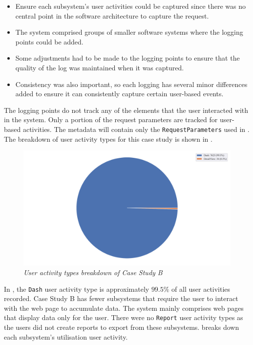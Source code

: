 \begin{itemize}
	\item Ensure each subsystem's user activities could be captured since there was no central point in the software architecture to capture the request. 
	\item The system comprised groups of smaller software systems where the logging points could be added.
	\item Some adjustments had to be made to the logging points to ensure that the quality of the log was maintained when it was captured. 
	\item Consistency was also important, so each logging has several minor differences added to ensure it can consistently capture certain user-based events.
\end{itemize}

The logging points do not track any of the elements that the user interacted with in the system. Only a portion of the request parameters are tracked for user-based activities. The metadata will contain only the \texttt{RequestParameters} used in . The breakdown of user activity types for this case study is shown in .

\begin{figure}[!htb]
	\centering %
	\includegraphics[width=0.95\linewidth]{img/ch3/analysis/case_B_breakdown.pdf}
	\caption[User activity types breakdown of Case Study B]
	{\textit{User activity types breakdown of Case Study B}}\label{fig:ch3_caseBBreakdown}
\end{figure}

In , the \texttt{Dash} user activity type is approximately $99.5\%$ of all user activities recorded. Case Study B has fewer subsystems that require the user to interact with the web page to accumulate data. The system mainly comprises web pages that display data only for the user. There were no \texttt{Report} user activity types as the users did not create reports to export from these subsystems.  breaks down each subsystem's utilisation user activity.


